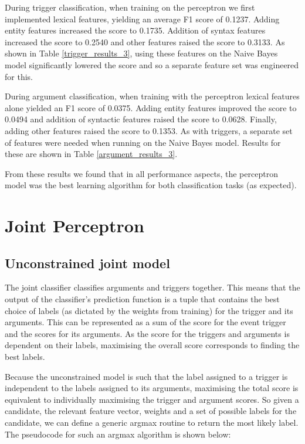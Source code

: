 \documentclass{article} %
\begin{document}
During trigger classification, when training on the perceptron we first implemented lexical features, yielding an average F1 score of 0.1237. Adding entity features increased the score to 0.1735. Addition of syntax features increased the score to 0.2540 and other features raised the score to 0.3133. As shown in Table \ref{trigger_results_3}, using these features on the Naive Bayes model significantly lowered the score and so a separate feature set was engineered for this. 

During argument classification, when training with the perceptron lexical features alone yielded an F1 score of 0.0375. Adding entity features improved the score to 0.0494 and addition of syntactic features raised the score to 0.0628. Finally, adding other features raised the score to 0.1353. As with triggers, a separate set of features were needed when running on the Naive Bayes model. Results for these are shown in Table \ref{argument_results_3}.

From these results we found that in all performance aspects, the perceptron model was the best learning algorithm for both classification tasks (as expected).
\section{Joint Perceptron}

\subsection{Unconstrained joint model}
The joint classifier classifies arguments and triggers together. This means that the output of the classifier's prediction function is a tuple that contains the best choice of labels (as dictated by the weights from training) for the trigger and its arguments. This can be represented as a sum of the score for the event trigger and the scores for its arguments. As the score for the triggers and arguments is dependent on their labels, maximising the overall score corresponds to finding the best labels. 

Because the unconstrained model is such that the label assigned to a trigger is independent to the labels assigned to its arguments, maximising the total score is equivalent to individually maximising the trigger and argument scores. So given a candidate, the relevant feature vector, weights and a set of possible labels for the candidate, we can define a generic argmax routine to return the most likely label. The pseudocode for such an argmax algorithm is shown below:
\end{document}
